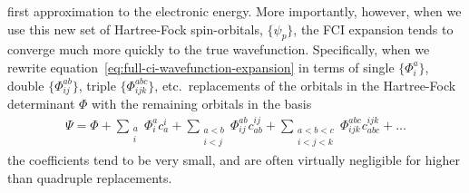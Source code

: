 first approximation to the electronic energy.
More importantly, however, when we use this new set of Hartree-Fock spin-orbitals, $\{\psi_p\}$, the FCI expansion tends to converge much more quickly to the true wavefunction.
Specifically, when we rewrite equation~\ref{eq:full-ci-wavefunction-expansion}
in terms of single $\{\Phi_i^a\}$, double $\{\Phi_{ij}^{ab}\}$, triple
$\{\Phi_{ijk}^{abc}\}$, etc.\ replacements of the orbitals in the Hartree-Fock
determinant $\Phi$ with the remaining orbitals in the basis
\begin{align}
  \Psi
=
  \Phi
+
  \sum_{\substack{a\\i}}
  \Phi_i^ac_a^i
+
  \sum_{\substack{a<b\\i<j}}
  \Phi_{ij}^{ab}c_{ab}^{ij}
+
  \sum_{\substack{a<b<c\\i<j<k}}
  \Phi_{ijk}^{abc}c_{abc}^{ijk}
  +\ldots
\end{align}
the coefficients tend to be very small, and are often virtually negligible for higher than quadruple replacements.

